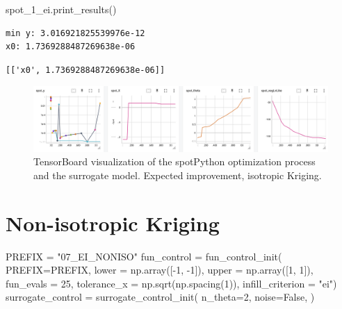 \documentclass[
  letterpaper,
  DIV=11,
  numbers=noendperiod]{scrreprt}
\newenvironment{Shaded}{\begin{snugshade}}{\end{snugshade}}
\newcommand{\DecValTok}[1]{\textcolor[rgb]{0.68,0.00,0.00}{#1}}
\newcommand{\NormalTok}[1]{\textcolor[rgb]{0.00,0.23,0.31}{#1}}
\newcommand{\OperatorTok}[1]{\textcolor[rgb]{0.37,0.37,0.37}{#1}}
\newcommand{\StringTok}[1]{\textcolor[rgb]{0.13,0.47,0.30}{#1}}
\newcommand{\VariableTok}[1]{\textcolor[rgb]{0.07,0.07,0.07}{#1}}
\begin{document}
\begin{Shaded}
\begin{Highlighting}[]
\NormalTok{spot\_1\_ei.print\_results()}
\end{Highlighting}
\end{Shaded}

\begin{verbatim}
min y: 3.016921825539976e-12
x0: 1.7369288487269638e-06
\end{verbatim}

\begin{verbatim}
[['x0', 1.7369288487269638e-06]]
\end{verbatim}

\begin{figure}[H]

{\centering \includegraphics[width=1\textwidth,height=\textheight]{figures_static/07_tensorboard_EI_ISO.png}

}

\caption{TensorBoard visualization of the spotPython optimization
process and the surrogate model. Expected improvement, isotropic
Kriging.}

\end{figure}%

\section{Non-isotropic Kriging}\label{non-isotropic-kriging}

\begin{Shaded}
\begin{Highlighting}[]
\NormalTok{PREFIX }\OperatorTok{=} \StringTok{"07\_EI\_NONISO"}
\NormalTok{fun\_control }\OperatorTok{=}\NormalTok{ fun\_control\_init(}
\NormalTok{    PREFIX}\OperatorTok{=}\NormalTok{PREFIX,}
\NormalTok{    lower }\OperatorTok{=}\NormalTok{ np.array([}\OperatorTok{{-}}\DecValTok{1}\NormalTok{, }\OperatorTok{{-}}\DecValTok{1}\NormalTok{]),}
\NormalTok{    upper }\OperatorTok{=}\NormalTok{ np.array([}\DecValTok{1}\NormalTok{, }\DecValTok{1}\NormalTok{]),}
\NormalTok{    fun\_evals }\OperatorTok{=} \DecValTok{25}\NormalTok{,}
\NormalTok{    tolerance\_x }\OperatorTok{=}\NormalTok{ np.sqrt(np.spacing(}\DecValTok{1}\NormalTok{)),}
\NormalTok{    infill\_criterion }\OperatorTok{=} \StringTok{"ei"}\NormalTok{)}
\NormalTok{surrogate\_control }\OperatorTok{=}\NormalTok{ surrogate\_control\_init(}
\NormalTok{    n\_theta}\OperatorTok{=}\DecValTok{2}\NormalTok{,}
\NormalTok{    noise}\OperatorTok{=}\VariableTok{False}\NormalTok{,}
\NormalTok{    )}
\end{Highlighting}
\end{Shaded}
\end{document}
